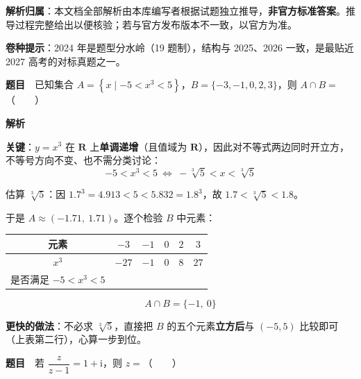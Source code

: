 

\begin{gknotice}
\textbf{解析归属}：本文档全部解析由本库编写者根据试题独立推导，\textbf{非官方标准答案}。推导过程完整给出以便核验；若与官方发布版本不一致，以官方为准。

\textbf{卷种提示}：2024 年是题型分水岭（19 题制），结构与 2025、2026 一致，是最贴近 2027 高考的对标真题之一。
\end{gknotice}

\par\medskip



\textbf{题目}　已知集合 $A=\left\{x\mid-5<x^{3}<5\right\}$，$B=\{-3,-1,0,2,3\}$，则 $A\cap B=$（　　）

\textbf{解析}

\textbf{关键}：$y=x^{3}$ 在 $\mathbf R$ 上\textbf{单调递增}（且值域为 $\mathbf R$），因此对不等式两边同时开立方，不等号方向不变、也不需分类讨论：
\[-5<x^{3}<5\ \Longleftrightarrow\ -\sqrt[3]5<x<\sqrt[3]5\]

估算 $\sqrt[3]5$：因 $1.7^{3}=4.913<5<5.832=1.8^{3}$，故 $1.7<\sqrt[3]5<1.8$。

于是 $A\approx(-1.71,\ 1.71)$。逐个检验 $B$ 中元素：

\begin{center}
\begin{tabular}{cccccc}
\toprule
元素 & $-3$ & $-1$ & $0$ & $2$ & $3$ \\
\midrule
$x^3$ & $-27$ & $-1$ & $0$ & $8$ & $27$ \\
是否满足 $-5<x^3<5$ &  &  &  &  &  \\
\bottomrule
\end{tabular}
\end{center}

\[A\cap B=\{-1,\ 0\}\]


\begin{gktip}
\textbf{更快的做法}：不必求 $\sqrt[3]5$，直接把 $B$ 的五个元素\textbf{立方后}与 $(-5,5)$ 比较即可（上表第二行），心算一步到位。
\end{gktip}

\par\medskip


\textbf{题目}　若 $\dfrac{z}{z-1}=1+\mathrm i$，则 $z=$（　　）

